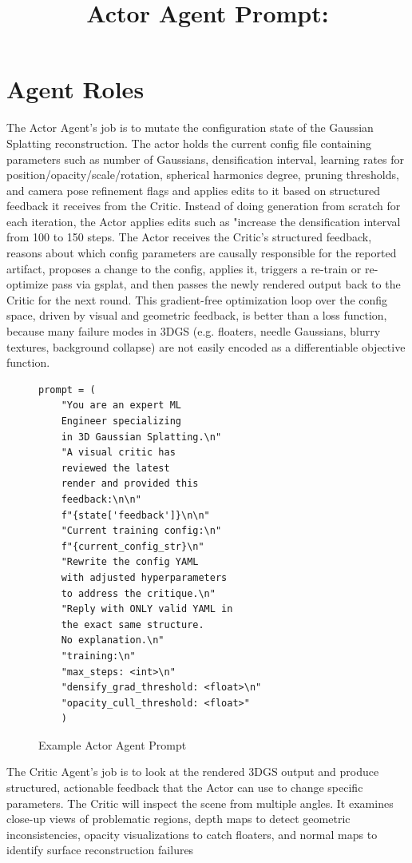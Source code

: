 \section{Agent Roles}
\label{sec:agent_roles}

\noindent The Actor Agent's job is to mutate the configuration state of the Gaussian Splatting reconstruction. The actor holds the current config file containing parameters such as number of Gaussians, densification interval, learning rates for position/opacity/scale/rotation, spherical harmonics degree, pruning thresholds, and camera pose refinement flags and applies edits to it based on structured feedback it receives from the Critic. Instead of doing generation from scratch for each iteration, the Actor applies edits such as "increase the densification interval from 100 to 150 steps. The Actor receives the Critic's structured feedback, reasons about which config parameters are causally responsible for the reported artifact, proposes a change to the config, applies it, triggers a re-train or re-optimize pass via gsplat, and then passes the newly rendered output back to the Critic for the next round. This gradient-free optimization loop over the config space, driven by visual and geometric feedback, is better than a loss function, because many failure modes in 3DGS (e.g. floaters, needle Gaussians, blurry textures, background collapse) are not easily encoded as a differentiable objective function.\\

\newpage
\noindent\title{Actor Agent Prompt:}
\begin{figure}[h]
\centering
\begin{verbatim}
prompt = (
    "You are an expert ML 
    Engineer specializing 
    in 3D Gaussian Splatting.\n"
    "A visual critic has 
    reviewed the latest 
    render and provided this 
    feedback:\n\n"
    f"{state['feedback']}\n\n"
    "Current training config:\n"
    f"{current_config_str}\n"
    "Rewrite the config YAML 
    with adjusted hyperparameters 
    to address the critique.\n"
    "Reply with ONLY valid YAML in 
    the exact same structure. 
    No explanation.\n"
    "training:\n"
    "max_steps: <int>\n"
    "densify_grad_threshold: <float>\n"
    "opacity_cull_threshold: <float>"
    )
\end{verbatim}
\caption{Example Actor Agent Prompt}
\label{fig:actor-agent-prompt}
\end{figure}

\noindent The Critic Agent's job is to look at the rendered 3DGS output and produce structured, actionable feedback that the Actor can use to change specific parameters. The Critic will inspect the scene from multiple angles. It examines close-up views of problematic regions, depth maps to detect geometric inconsistencies, opacity visualizations to catch floaters, and normal maps to identify surface reconstruction failures\\

